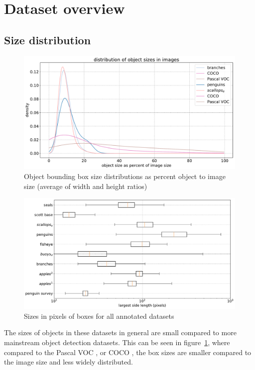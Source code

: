 \section {Dataset overview}
\subsection {Size distribution}

\begin{figure}[ht]
\centering
\includegraphics[width=1.0\linewidth]{charts/summaries/sizes_density.pdf}
\caption{Object bounding box size distributions as percent object to image size (average of width and height ratios) }
\label{fig:box_sizes}
\end{figure}


\begin{figure}[ht]
\centering
\includegraphics[width=1.0\linewidth]{charts/summaries/sizes_boxplot.pdf}
\caption{ Sizes in pixels of boxes for all annotated datasets }
\label{fig:box_sizes_plot}
\end{figure}

The sizes of objects in these datasets in general are small compared to more mainstream object detection datasets. This can be seen in figure~\ref{fig:box_sizes}, where compared to the Pascal VOC \cite{Everingham2008}, or COCO \cite{Lin2014}, the box sizes are smaller compared to the image size and less widely distributed. 

